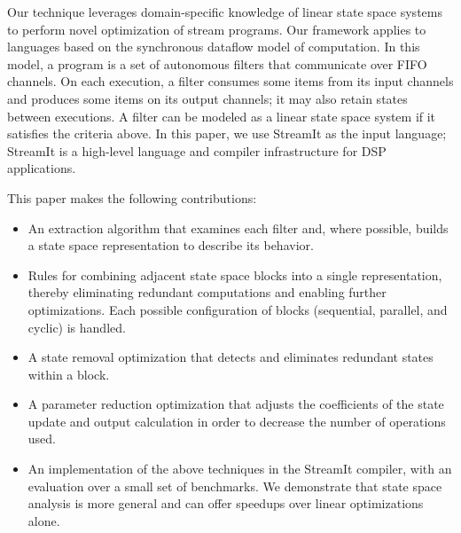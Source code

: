 Our technique leverages domain-specific knowledge of linear state
space systems to perform novel optimization of stream programs.  Our
framework applies to languages based on the synchronous dataflow model
of computation.  In this model, a program is a set of autonomous
filters that communicate over FIFO channels.  On each execution, a
filter consumes some items from its input channels and produces some
items on its output channels; it may also retain states between
executions.  A filter can be modeled as a linear state space system if
it satisfies the criteria above.  In this paper, we use StreamIt as
the input language; StreamIt is a high-level language and compiler
infrastructure for DSP applications.

This paper makes the following contributions:

\begin{itemize}

\vspace{\itemshrink} \item An extraction algorithm that examines each
filter and, where possible, builds a state space representation to
describe its behavior.

\vspace{\itemshrink} \item Rules for combining adjacent state space
blocks into a single representation, thereby eliminating redundant
computations and enabling further optimizations.  Each possible
configuration of blocks (sequential, parallel, and cyclic) is handled.

\vspace{\itemshrink} \item A state removal optimization that detects
and eliminates redundant states within a block.

\vspace{\itemshrink} \item A parameter reduction optimization that
adjusts the coefficients of the state update and output calculation in
order to decrease the number of operations used.

\vspace{\itemshrink} \item An implementation of the above techniques
in the StreamIt compiler, with an evaluation over a small set of
benchmarks.  We demonstrate that state space analysis is more general
and can offer speedups over linear optimizations alone.

\vspace{\itemshrink} \end{itemize}

